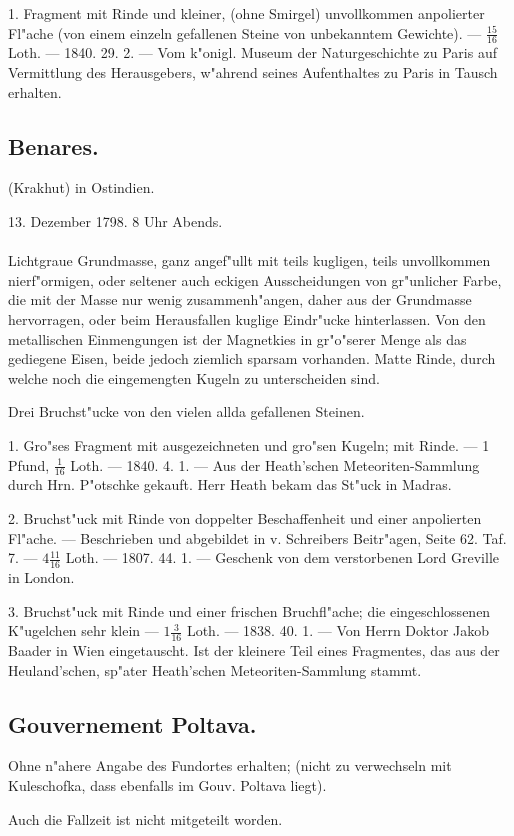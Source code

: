 \documentclass[a4paper, 11pt, oneside, polutonikogreek, german]{article}
\begin{document}
1. Fragment mit Rinde und kleiner, (ohne Smirgel) unvollkommen anpolierter Fl"ache (von einem einzeln gefallenen Steine von unbekanntem Gewichte). --- $\frac{15}{16}$ Loth. --- 1840. 29. 2. --- Vom k"onigl. Museum der Naturgeschichte zu Paris auf Vermittlung des Herausgebers, w"ahrend seines Aufenthaltes zu Paris in Tausch erhalten.
\subsection{Benares.}
\begin{center}
\small
(Krakhut) in Ostindien.

13. Dezember 1798. 8 Uhr Abends.
\end{center}
\paragraph{}
Lichtgraue Grundmasse, ganz angef"ullt mit teils kugligen, teils unvollkommen nierf"ormigen, oder seltener auch eckigen Ausscheidungen von gr"unlicher Farbe, die mit der Masse nur wenig zusammenh"angen, daher aus der Grundmasse hervorragen, oder beim Herausfallen kuglige Eindr"ucke hinterlassen. Von den metallischen Einmengungen ist der Magnetkies in gr"o"serer Menge als das gediegene Eisen, beide jedoch ziemlich sparsam vorhanden. Matte Rinde, durch welche noch die eingemengten Kugeln zu unterscheiden sind.

Drei Bruchst"ucke von den vielen allda gefallenen Steinen.

1. Gro"ses Fragment mit ausgezeichneten und gro"sen Kugeln; mit Rinde. --- 1 Pfund, $\frac{1}{16}$ Loth. --- 1840. 4. 1. --- Aus der Heath'schen Meteoriten-Sammlung durch Hrn. P"otschke gekauft. Herr Heath bekam das St"uck in Madras.

2. Bruchst"uck mit Rinde von doppelter Beschaffenheit und einer anpolierten Fl"ache. --- Beschrieben und abgebildet in v. Schreibers Beitr"agen, Seite 62. Taf. 7. --- $4\frac{11}{16}$ Loth. --- 1807. 44. 1. --- Geschenk von dem verstorbenen Lord Greville in London.

3. Bruchst"uck mit Rinde und einer frischen Bruchfl"ache; die eingeschlossenen K"ugelchen sehr klein --- $1\frac{3}{16}$ Loth. --- 1838. 40. 1. --- Von Herrn Doktor Jakob Baader in Wien eingetauscht. Ist der kleinere Teil eines Fragmentes, das aus der Heuland'schen, sp"ater Heath'schen Meteoriten-Sammlung stammt.
\subsection{Gouvernement Poltava.}
\begin{center}
\small
Ohne n"ahere Angabe des Fundortes erhalten; (nicht zu verwechseln mit Kuleschofka, dass ebenfalls im Gouv. Poltava liegt).

Auch die Fallzeit ist nicht mitgeteilt worden.
\end{center}
\end{document}
